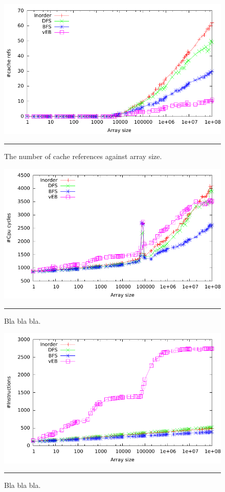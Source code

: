 \begin{figure}[htbp]
	\centering
		\includegraphics[width=\textwidth]{./Figures/Project1/Cache_refs.pdf}
		\rule{35em}{0.5pt}
	\caption[Cache refs]{
	The number of cache references against array size.
	}
	\label{fig:Cache_refs_p1}
\end{figure}



\begin{figure}[htbp]
	\centering
		\includegraphics[width=\textwidth]{./Figures/Project1/Cpu_cycles.pdf}
		\rule{35em}{0.5pt}
	\caption[CPU cycles]{
	Bla bla bla.
	}
	\label{fig:Cpu_cycles_p1}
\end{figure}


\begin{figure}[htbp]
	\centering
		\includegraphics[width=\textwidth]{./Figures/Project1/Instructions.pdf}
		\rule{35em}{0.5pt}
	\caption[Instructions]{
	Bla bla bla.
	}
	\label{fig:Instructions_p1}
\end{figure}


